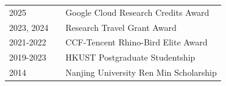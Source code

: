 
\begin{table}[h]
    \begin{tabular}{lcl}
      2025 & \hspace{10pt} & Google Cloud Research Credits Award \\
      2023, 2024 & \hspace{10pt} & Research Travel Grant Award \\
      2021-2022 & \hspace{10pt} & CCF-Tencent Rhino-Bird Elite Award \\
      2019-2023 & \hspace{10pt} & HKUST Postgraduate Studentship \\
      2014      & \hspace{10pt} & Nanjing University Ren Min Scholarship
    \end{tabular}
\end{table}

